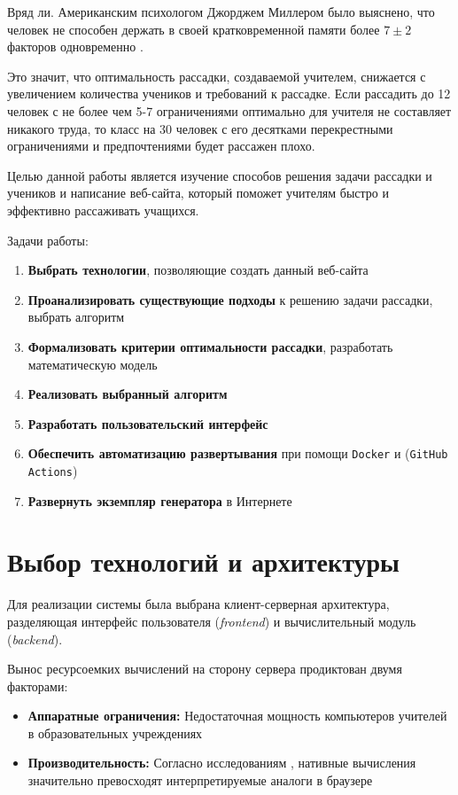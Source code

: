 \documentclass[12pt,a4paper]{extarticle} %
\begin{document}
	Вряд ли. Американским психологом Джорджем Миллером было выяснено, что человек не способен держать в своей кратковременной памяти более $7 \pm 2$  факторов одновременно \cite{miller1956}.
	
	Это значит, что оптимальность рассадки, создаваемой учителем, снижается с увеличением количества учеников и требований к рассадке. Если рассадить до 12 человек с не более чем 5-7 ограничениями оптимально для учителя не составляет никакого труда, то класс на 30 человек с его десятками перекрестными ограничениями и предпочтениями будет рассажен плохо.
	
	Целью данной работы является изучение способов решения задачи рассадки и учеников и написание веб-сайта, который поможет учителям быстро и эффективно рассаживать учащихся.
	
	Задачи работы:
	
	\begin{enumerate}
		\item \textbf{Выбрать технологии}, позволяющие создать данный веб-сайта
		\item \textbf{Проанализировать существующие подходы} к решению задачи рассадки, выбрать алгоритм
		\item \textbf{Формализовать критерии оптимальности рассадки}, разработать математическую модель
		\item \textbf{Реализовать выбранный алгоритм}
		\item \textbf{Разработать пользовательский интерфейс}
		\item \textbf{Обеспечить автоматизацию развертывания} при помощи \texttt{Docker} и (\texttt{GitHub Actions})
		\item \textbf{Развернуть экземпляр генератора} в Интернете
	\end{enumerate}
	
	\newpage
	
	\section{Выбор технологий и архитектуры}
	
	Для реализации системы была выбрана клиент-серверная архитектура, разделяющая интерфейс пользователя (\textit{frontend}) и вычислительный модуль (\textit{backend}). 
	
	Вынос ресурсоемких вычислений на сторону сервера продиктован двумя факторами:
	\begin{itemize}
		\item \textbf{Аппаратные ограничения:} Недостаточная мощность компьютеров учителей в образовательных учреждениях
		\item \textbf{Производительность:} Согласно исследованиям \cite{usenix_webassembly}, нативные вычисления значительно превосходят интерпретируемые аналоги в браузере
	\end{itemize}
	
\end{document}
